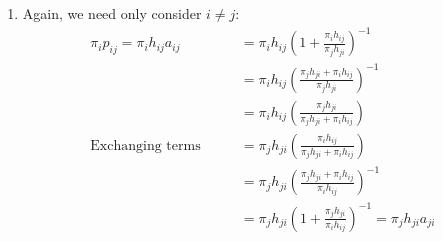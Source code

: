 \documentclass[12pt]{article}
\theoremstyle{plain}
\theoremstyle{definition}
\theoremstyle{remark}
\begin{document}
\begin{enumerate}
\begin{enumerate}
    \item %
      Again, we need only consider $i\neq j$:
      \begin{align*}
        \pi_i p_{ij} = 
          \pi_i h_{ij}a_{ij} 
          &= \pi_i h_{ij} \left(1+\frac{\pi_i h_{ij}}{\pi_j h_{ji}}\right)^{-1} \\
          &= \pi_i h_{ij} \left(\frac{\pi_j h_{ji} + \pi_i h_{ij}}{\pi_j h_{ji}}\right)^{-1} \\
          &= \pi_i h_{ij} \left(\frac{\pi_j h_{ji}}{\pi_j h_{ji} + \pi_i h_{ij}}\right) \\
          \text{Exchanging terms} \qquad
            &= \pi_j h_{ji}\left(\frac{\pi_i h_{ij} }{\pi_j h_{ji} + \pi_i h_{ij}}\right) \\
            &= \pi_j h_{ji}\left(\frac{\pi_j h_{ji} + \pi_i h_{ij}}{\pi_i h_{ij} }\right)^{-1} \\
            &= \pi_j h_{ji}\left(1+\frac{\pi_j h_{ji}}{\pi_i h_{ij} }\right)^{-1} 
            = \pi_j h_{ji} a_{ji}
      \end{align*}
      

  \end{enumerate}

\end{enumerate}





\end{document}
